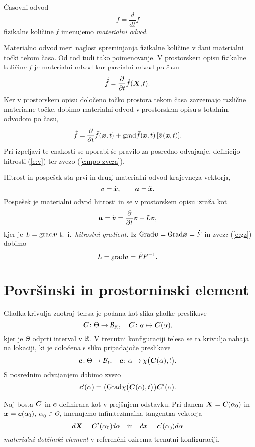 \begin{definicija}
	Časovni odvod
	\[ \dot{f}=\frac{d}{dt}f \]
	fizikalne količine $f$ imenujemo \emph{materialni odvod}.
\end{definicija}
Materialno odvod meri naglost spreminjanja fizikalne količine v dani materialni točki tekom
časa. Od tod tudi tako poimenovanje. V prostorskem opisu fizikalne količine $f$ je materialni
odvod kar parcialni odvod po času
\[ \dot{\hat{f}}=\frac{\partial}{\partial t}\hat{f}(\boldsymbol X,t). \]
Ker v prostorskem opisu določeno točko prostora tekom časa zavzemajo različne
materialne točke, dobimo materialni odvod v prostorskem opisu s totalnim odvodom po času,
\begin{equation} \label{e:matodv}
	\dot{\bar{f}} = \frac{\partial}{\partial t}\bar{f}(\boldsymbol x,t) +
	\mathrm{grad} \bar{f}(\boldsymbol x,t)\,[\bar{\boldsymbol v}(\boldsymbol x,t)].
\end{equation}
Pri izpeljavi te enakosti se uporabi še pravilo za posredno odvajanje,
definicijo hitrosti (\ref{e:v}) ter zvezo (\ref{e:mpo-zveza}).
\begin{primer}
	Hitrost in pospešek sta prvi in drugi materialni odvod krajevnega vektorja,
	\[ \boldsymbol v=\dot{\boldsymbol x},\qquad \boldsymbol a=\ddot{\boldsymbol x}. \]
	Pospešek je materialni odvod hitrosti in se v prostorskem opisu izraža kot
	\[ \boldsymbol a=\dot{\boldsymbol v}=\frac{\partial}{\partial t}\boldsymbol v+L\boldsymbol v, \]
	kjer je $L=\mathrm{grad}\boldsymbol v$ t.~i.~\emph{hitrostni gradient}. Iz $\mathrm{Grad}\boldsymbol v=\mathrm{Grad}{\dot{\boldsymbol x}}=\dot{F}$ in
	zveze (\ref{e:gz}) dobimo
	\begin{equation} \label{e:L} L=\mathrm{grad}\boldsymbol v=\dot{F}F^{-1}. \end{equation}
\end{primer}


\section{Površinski in prostorninski element}


Gladka krivulja znotraj telesa je podana kot slika gladke preslikave
\[\boldsymbol C\colon \Theta\to\mathcal{B}_{\mathrm{R}}, \quad \boldsymbol C\colon\alpha\mapsto\boldsymbol C(\alpha),\]
kjer je $\Theta$ odprti interval v $\mathbb R$.
V trenutni konfiguraciji telesa se ta krivulja nahaja na lokaciji, ki je določena s sliko pripadajoče preslikave
\[ \boldsymbol c\colon \Theta\to\mathcal B_t,\quad \boldsymbol c\colon\alpha\mapsto\chi\big(\boldsymbol C(\alpha),t\big). \]
S posrednim odvajanjem dobimo zvezo
\begin{equation} \label{e:3101}
	\boldsymbol c'(\alpha) = \big( \mathrm{Grad}\chi\big(\boldsymbol C(\alpha),t\big)\big)\boldsymbol C'(\alpha).
\end{equation}
\begin{definicija}
	Naj bosta $\boldsymbol C$ in $\boldsymbol c$ definirana kot v prejšnjem odstavku.
	Pri danem $\boldsymbol X=\boldsymbol C(\alpha_0)$ in $\boldsymbol x=\boldsymbol c(\alpha_0)$, $\alpha_0\in\Theta$, imenujemo
	infinitezimalna tangentna vektorja
	\[ d\boldsymbol X=\boldsymbol C'(\alpha_0)d\alpha \quad \mathrm{in} \quad d\boldsymbol x=\boldsymbol c'(\alpha_0)d\alpha \]
	\emph{materialni dolžinski element} v referenčni oziroma trenutni konfiguraciji.
\end{definicija}

